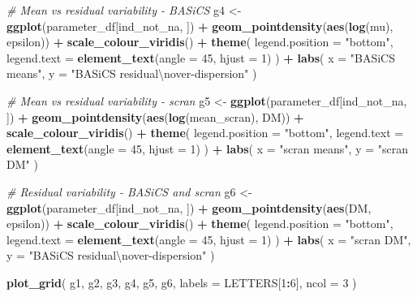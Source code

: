 \documentclass[9pt,a4paper,]{extarticle}
\newenvironment{Shaded}{\begin{snugshade}}{\end{snugshade}}
\newcommand{\CharTok}[1]{\textcolor[rgb]{0.31,0.60,0.02}{#1}}
\newcommand{\CommentTok}[1]{\textcolor[rgb]{0.56,0.35,0.01}{\textit{#1}}}
\newcommand{\DataTypeTok}[1]{\textcolor[rgb]{0.13,0.29,0.53}{#1}}
\newcommand{\DecValTok}[1]{\textcolor[rgb]{0.00,0.00,0.81}{#1}}
\newcommand{\KeywordTok}[1]{\textcolor[rgb]{0.13,0.29,0.53}{\textbf{#1}}}
\newcommand{\NormalTok}[1]{#1}
\newcommand{\OperatorTok}[1]{\textcolor[rgb]{0.81,0.36,0.00}{\textbf{#1}}}
\newcommand{\StringTok}[1]{\textcolor[rgb]{0.31,0.60,0.02}{#1}}
\begin{document}
\begin{Shaded}
\begin{Highlighting}[]
\CommentTok{# Mean vs residual variability - BASiCS}
\NormalTok{g4 <-}\StringTok{ }\KeywordTok{ggplot}\NormalTok{(parameter_df[ind_not_na, ]) }\OperatorTok{+}
\StringTok{  }\KeywordTok{geom_pointdensity}\NormalTok{(}\KeywordTok{aes}\NormalTok{(}\KeywordTok{log}\NormalTok{(mu), epsilon)) }\OperatorTok{+}
\StringTok{  }\KeywordTok{scale_colour_viridis}\NormalTok{() }\OperatorTok{+}
\StringTok{  }\KeywordTok{theme}\NormalTok{(}
    \DataTypeTok{legend.position =} \StringTok{"bottom"}\NormalTok{,}
    \DataTypeTok{legend.text =} \KeywordTok{element_text}\NormalTok{(}\DataTypeTok{angle =} \DecValTok{45}\NormalTok{, }\DataTypeTok{hjust =} \DecValTok{1}\NormalTok{)}
\NormalTok{  ) }\OperatorTok{+}
\StringTok{  }\KeywordTok{labs}\NormalTok{(}
    \DataTypeTok{x =} \StringTok{"BASiCS means"}\NormalTok{,}
    \DataTypeTok{y =} \StringTok{"BASiCS residual}\CharTok{\textbackslash{}n}\StringTok{over-dispersion"}
\NormalTok{  )}

\CommentTok{# Mean vs residual variability - scran}
\NormalTok{g5 <-}\StringTok{ }\KeywordTok{ggplot}\NormalTok{(parameter_df[ind_not_na, ]) }\OperatorTok{+}
\StringTok{  }\KeywordTok{geom_pointdensity}\NormalTok{(}\KeywordTok{aes}\NormalTok{(}\KeywordTok{log}\NormalTok{(mean_scran), DM)) }\OperatorTok{+}
\StringTok{  }\KeywordTok{scale_colour_viridis}\NormalTok{() }\OperatorTok{+}
\StringTok{  }\KeywordTok{theme}\NormalTok{(}
    \DataTypeTok{legend.position =} \StringTok{"bottom"}\NormalTok{,}
    \DataTypeTok{legend.text =} \KeywordTok{element_text}\NormalTok{(}\DataTypeTok{angle =} \DecValTok{45}\NormalTok{, }\DataTypeTok{hjust =} \DecValTok{1}\NormalTok{)}
\NormalTok{  ) }\OperatorTok{+}
\StringTok{  }\KeywordTok{labs}\NormalTok{(}
    \DataTypeTok{x =} \StringTok{"scran means"}\NormalTok{,}
    \DataTypeTok{y =} \StringTok{"scran DM"}
\NormalTok{  )}

\CommentTok{# Residual variability - BASiCS and scran}
\NormalTok{g6 <-}\StringTok{ }\KeywordTok{ggplot}\NormalTok{(parameter_df[ind_not_na, ]) }\OperatorTok{+}
\StringTok{  }\KeywordTok{geom_pointdensity}\NormalTok{(}\KeywordTok{aes}\NormalTok{(DM, epsilon)) }\OperatorTok{+}
\StringTok{  }\KeywordTok{scale_colour_viridis}\NormalTok{() }\OperatorTok{+}
\StringTok{  }\KeywordTok{theme}\NormalTok{(}
    \DataTypeTok{legend.position =} \StringTok{"bottom"}\NormalTok{,}
    \DataTypeTok{legend.text =} \KeywordTok{element_text}\NormalTok{(}\DataTypeTok{angle =} \DecValTok{45}\NormalTok{, }\DataTypeTok{hjust =} \DecValTok{1}\NormalTok{)}
\NormalTok{  ) }\OperatorTok{+}
\StringTok{  }\KeywordTok{labs}\NormalTok{(}
    \DataTypeTok{x =} \StringTok{"scran DM"}\NormalTok{,}
    \DataTypeTok{y =} \StringTok{"BASiCS residual}\CharTok{\textbackslash{}n}\StringTok{over-dispersion"}
\NormalTok{  )}

\KeywordTok{plot_grid}\NormalTok{(}
\NormalTok{  g1, g2, g3, }
\NormalTok{  g4, g5, g6, }
  \DataTypeTok{labels =}\NormalTok{ LETTERS[}\DecValTok{1}\OperatorTok{:}\DecValTok{6}\NormalTok{],}
  \DataTypeTok{ncol =} \DecValTok{3}
\NormalTok{)}
\end{Highlighting}
\end{Shaded}
\end{document}
